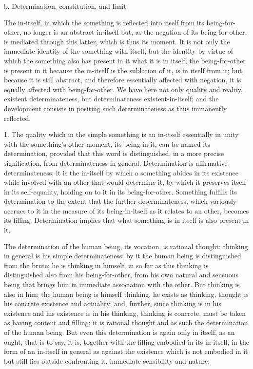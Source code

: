 b. Determination, constitution, and limit

The in-itself, in which the something is
reflected into itself from its being-for-other,
no longer is an abstract in-itself
but, as the negation of its being-for-other,
is mediated through this latter,
which is thus its moment.
It is not only the immediate identity of
the something with itself,
but the identity by virtue of which
the something also has present in it
what it is in itself;
the being-for-other is present in it
because the in-itself is the sublation of it,
is in itself from it;
but, because it is still abstract,
and therefore essentially affected with negation,
it is equally affected with being-for-other.
We have here not only quality and reality,
existent determinateness,
but determinateness existent-in-itself;
and the development consists in positing
such determinateness as thus immanently reflected.

1. The quality which in the simple
something is an in-itself
essentially in unity with
the something's other moment,
its being-in-it,
can be named its determination,
provided that this word is distinguished,
in a more precise signification,
from determinateness in general.
Determination is affirmative determinateness;
it is the in-itself by which
a something abides in its existence
while involved with an other
that would determine it,
by which it preserves itself
in its self-equality,
holding on to it in its being-for-other.
Something fulfills its determination
to the extent that the further determinateness,
which variously accrues to it
in the measure of its being-in-itself
as it relates to an other,
becomes its filling.
Determination implies that
what something is in itself
is also present in it.

The determination of the human being,
its vocation, is rational thought:
thinking in general is his simple determinateness;
by it the human being is distinguished from the brute;
he is thinking in himself, in so far as this thinking is
distinguished also from his being-for-other,
from his own natural and sensuous being
that brings him in immediate association with the other.
But thinking is also in him;
the human being is himself thinking,
he exists as thinking,
thought is his concrete existence and actuality;
and, further, since thinking is in his existence
and his existence is in his thinking,
thinking is concrete,
must be taken as having content and filling;
it is rational thought and as such
the determination of the human being.
But even this determination is again
only in itself, as an ought, that is to say,
it is, together with the filling embodied in its in-itself,
in the form of an in-itself in general
as against the existence which is not embodied in it
but still lies outside confronting it,
immediate sensibility and nature.

